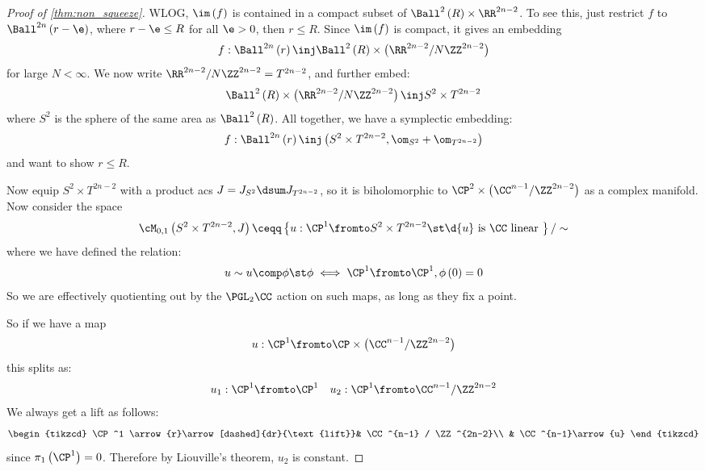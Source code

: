 \documentclass{amsart}
\begin{document}
\begin{proof}[Proof of \cref{thm:non_squeeze}]
WLOG, $\im\left( f \right)$ is contained in a compact subset of
$\Ball^2\left( R \right) \times \RR^{2n-2}$. 
To see this, just restrict $f$ to $\Ball^{2n}\left( r - \e \right)$, where
$r - \e \leq R$ for all $\e > 0$, then $r \leq R$.
Since $\im\left( f \right)$ is compact, it gives an embedding
\begin{equation}
f:\Ball^{2n}\left( r \right) \inj \Ball^2\left( R \right) \times
\left( \RR^{2n-2} / N \ZZ^{2n-2} \right)
\end{equation}
for large $N < \infty$.
We now write $\RR^{2n - 2} / N\ZZ^{2n - 2} = T^{2n-2}$, and further embed:
\begin{equation}
\Ball^2\left( R \right) \times
\left( \RR^{2n-2} / N \ZZ^{2n-2} \right)
\inj S^2 \times T^{2n-2}
\end{equation}
where $S^2$ is the sphere of the same area as $\Ball^2\left( R \right)$.
All together, we have a symplectic embedding:
\begin{equation}
f: \Ball^{2n}\left( r \right)\inj \left(S^2 \times T^{2n-2},
\om_{S^2} + \om_{T^{2n-2}}\right)
\end{equation}
and want to show $r \leq R$.

Now equip $S^2 \times T^{2n-2}$ with a product acs
$J = J_{S^2} \dsum J_{T^{2n-2}}$, so it is biholomorphic to
$\CP^2 \times \left( \CC^{n-1} / \ZZ^{2n-2} \right)$ as a complex manifold.
Now consider the space
\begin{equation}
\cM_{0,1}\left( S^2 \times T^{2n-2} , J \right)
\ceqq
\left\{ u: \CP^1 \fromto S^2 \times T^{2n-2} \st
\d{u} \text{ is } \CC \text{ linear }\right\} / \sim
\end{equation}
where we have defined the relation:
\begin{equation}
u\sim u\comp \phi \st \phi 
\iff \CP^1 \fromto \CP^1, \phi\left( 0 \right) = 0
\end{equation}
So we are effectively quotienting out by the
$\PGL_2 \CC$ action on such maps, as long as they fix a point.

So if we have a map
\begin{equation}
u:\CP^1 \fromto \CP\times\left( \CC^{n-1} / \ZZ^{2n-2} \right)
\end{equation}
this splits as:
\begin{align}
u_1:\CP^1 \fromto \CP^1
&&
u_2:\CP^1 \fromto \CC^{n-1} / \ZZ^{2n-2}
\end{align}
We always get a lift as follows:
\begin{equation}
\begin{tikzcd}
\CP^1 \arrow{r}\arrow[dashed]{dr}{\text{lift}}&
\CC^{n-1} / \ZZ^{2n-2}\\
& \CC^{n-1}\arrow{u}
\end{tikzcd}
\end{equation}
since $\pi_1\left( \CP^1 \right) = 0$.
Therefore by Liouville's theorem, $u_2$ is constant.


\end{proof}
\end{document}
